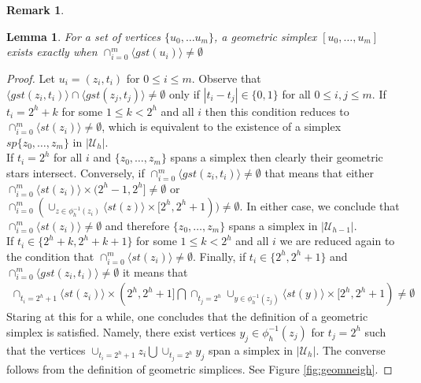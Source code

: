 \documentclass[a4paper,11pt]{article}
\theoremstyle{definition}
\newtheorem*{remark}{Remark}
\theoremstyle{plain}
\newtheorem{lemma}[definition]{Lemma}
\theoremstyle{remark}
\begin{document}
\begin{remark}
\begin{lemma} \label{geomsexist} For a set of vertices $\{u_0,\dots u_m\}$, a geometric simplex $[u_0,\dots, u_m]$ exists exactly when $\cap_{i=0}^{m} \langle gst(u_i)\rangle \neq \emptyset$
\end{lemma}  

\begin{proof} Let $u_i = (z_i,t_i)$ for $0\leq i\leq m$. Observe that $\langle gst(z_i,t_i) \rangle \cap \langle gst(z_j, t_j)\rangle \neq \emptyset$ only if $|t_i-t_j| \in \{0,1\}$ for all $0\leq i,j\leq m$. If $t_i = 2^h+k$ for some $1\leq k < 2^{h}$ and all $i$ then this condition reduces to $\cap_{i=0}^{m}\langle st(z_i) \rangle \neq \emptyset$, which is equivalent to the existence of a simplex $sp\{z_0,\dots,z_m\}$ in $|\mathcal{U}_{h}|$. \\

 If $t_i=2^h$ for all $i$ and $\{z_0,\dots,z_{m}\}$ spans a simplex then clearly their geometric stars intersect. Conversely, if $\cap_{i=0}^{m} \langle gst(z_i,t_i) \rangle \neq \emptyset$ that means that either $\cap_{i=0}^{m}\langle st(z_i) \rangle \times (2^h-1, 2^h] \neq \emptyset$ or $\cap_{i=0}^{m}(\cup_{z\in \phi_{h}^{-1}(z_i)} \langle st(z) \rangle \times [2^h, 2^h +1)) \neq \emptyset$. In either case, we conclude that $\cap_{i=0}^{m}\langle st(z_i) \rangle \neq \emptyset$ and therefore $\{z_0,\dots,z_{m}\}$ spans a simplex in $|\mathcal{U}_{h-1}|$. \\

If $t_i\in \{2^h+k, 2^h+k+1\}$ for some $1\leq k <2^{h}$ and all $i$ we are reduced again to the condition that $\cap_{i=0}^{m} \langle st(z_i) \rangle \neq \emptyset$. Finally, if $t_i\in \{2^h,2^h+1\}$ and $\cap_{i=0}^{m} \langle gst(z_i,t_i)\rangle \neq \emptyset$ it means that 
\begin{align*}
\cap_{t_i=2^h+1} \langle st(z_i) \rangle \times (2^h, 2^h+1] \bigcap \cap_{t_j=2^h} \cup_{y\in \phi_{h}^{-1}(z_j)} \langle st(y) \rangle \times [2^h, 2^h+1) \neq \emptyset 
\end{align*}
Staring at this for a while, one concludes that the definition of a geometric simplex is satisfied. Namely, there exist vertices $y_j\in \phi_{h}^{-1}(z_j)$ for $t_{j} = 2^h$ such that the vertices $\cup_{t_{i}=2^h+1} z_i \bigcup \cup_{t_j=2^h} y_j$ span a simplex in $|\mathcal{U}_{h}|$. The converse follows from the definition of geometric simplices. See Figure \ref{fig:geomneigh}. 
 \end{proof}
\end{remark}
\end{document}
